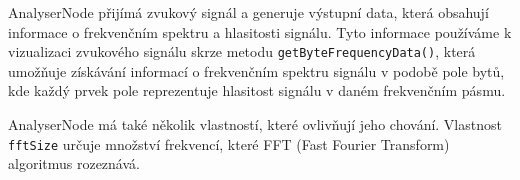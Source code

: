 AnalyserNode přijímá zvukový signál a generuje výstupní data, která obsahují
informace o frekvenčním spektru a hlasitosti signálu. Tyto informace používáme 
k vizualizaci zvukového signálu skrze metodu \texttt{getByteFrequencyData()}, která
umožňuje získávání informací o frekvenčním spektru signálu v podobě pole bytů,
kde každý prvek pole reprezentuje hlasitost signálu v daném frekvenčním pásmu. \autocite{analysernode-mdn}

AnalyserNode má také několik vlastností, které ovlivňují jeho chování.
Vlastnost \texttt{fftSize} určuje množství frekvencí, které FFT (Fast Fourier Transform) algoritmus
rozeznává.
